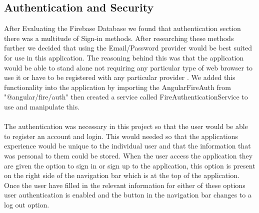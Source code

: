\subsection{Authentication and Security}
After Evaluating the Firebase Database we found that authentication section there was a multitude of Sign-in methods.  After researching these methods further we decided that using the Email/Password provider would be best suited for use in this application.  The reasoning behind this was that the application would be able to stand alone not requiring any particular type of web browser to use it or have to be registered with any particular provider \cite{auth}.  We added this functionality into the application by importing the AngularFireAuth from "@angular/fire/auth" then created a service called FireAuthenticationService to use and manipulate this.  \\\\
The authentication was necessary in this project so that the user would be able to register an account and login.  This would needed so that the applications experience would be unique to the individual user and that the information that was personal to them could be stored.  When the user access the application they are given the option to sign in or sign up to the application, this option is present on the right side of the navigation bar which is at the top of the application.  Once the user have filled in the relevant information for either of these options user authentication is enabled and the button in the navigation bar changes to a log out option.

